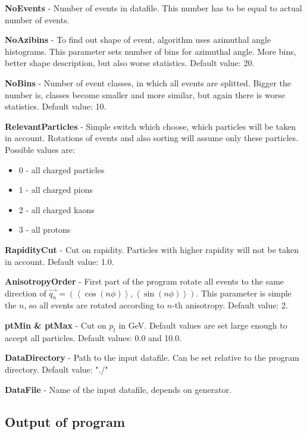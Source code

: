 \documentclass[a4paper]{article}
\begin{document}
\textbf{NoEvents} - Number of events in datafile. This number has to be equal to actual number of events.

\textbf{NoAzibins} - To find out shape of event, algorithm uses azimuthal angle histograms. This parameter sets number of bins for azimuthal angle. More bins, better shape description, but also worse statistics. Default value: 20.

\textbf{NoBins} - Number of event classes, in which all events are splitted. Bigger the number is, classes become smaller and more similar, but again there is worse statistics. Default value: 10.

\textbf{RelevantParticles} - Simple switch which choose, which particles will be taken in account. Rotations of events and also sorting will assume only these particles. Possible values are:
\begin{itemize}
\item 0 - all charged particles
\item 1 - all charged pions
\item 2 - all charged kaons
\item 3 - all protons
\end{itemize}

\textbf{RapidityCut} - Cut on rapidity. Particles with higher rapidity will not be taken in account. Default value: 1.0.

\textbf{AnisotropyOrder} - First part of the program rotate all events to the same direction of ${\vec{q_n}=\left(\left\langle \cos(n\phi)\right\rangle ,\left\langle \sin(n\phi)\right\rangle \right) }$. This parameter is simple the $n$, so all events are rotated according to $n$-th anisotropy. Default value: 2.

\textbf{ptMin \& ptMax} - Cut on $p_t$ in GeV. Default values are set large enough to accept all particles. Default values: 0.0 and 10.0.

\textbf{DataDirectory} - Path to the input datafile. Can be set relative to the program directory. Default value: "./"

\textbf{DataFile} - Name of the input datafile, depends on generator.

\subsection*{Output of program}
\end{document}
